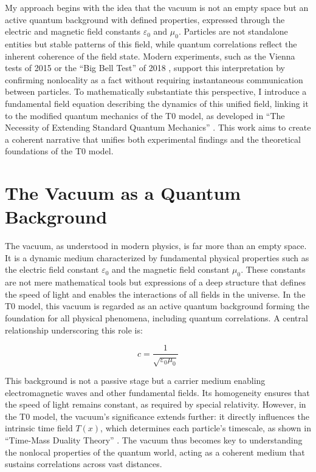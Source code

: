 \documentclass[a4paper,12pt]{article}
\newcommand{\Tfield}{T(x)}
\theoremstyle{definition}
\theoremstyle{remark}
\begin{document}
	My approach begins with the idea that the vacuum is not an empty space but an active quantum background with defined properties, expressed through the electric and magnetic field constants \(\varepsilon_0\) and \(\mu_0\). Particles are not standalone entities but stable patterns of this field, while quantum correlations reflect the inherent coherence of the field state. Modern experiments, such as the Vienna tests of 2015 \cite{Giustina2015} or the “Big Bell Test” of 2018 \cite{BigBellTest2018}, support this interpretation by confirming nonlocality as a fact without requiring instantaneous communication between particles. To mathematically substantiate this perspective, I introduce a fundamental field equation describing the dynamics of this unified field, linking it to the modified quantum mechanics of the T0 model, as developed in “The Necessity of Extending Standard Quantum Mechanics” \cite{pascher_quantum_2025}. This work aims to create a coherent narrative that unifies both experimental findings and the theoretical foundations of the T0 model.
	
	\section{The Vacuum as a Quantum Background}
	
	The vacuum, as understood in modern physics, is far more than an empty space. It is a dynamic medium characterized by fundamental physical properties such as the electric field constant \(\varepsilon_0\) and the magnetic field constant \(\mu_0\). These constants are not mere mathematical tools but expressions of a deep structure that defines the speed of light and enables the interactions of all fields in the universe. In the T0 model, this vacuum is regarded as an active quantum background forming the foundation for all physical phenomena, including quantum correlations. A central relationship underscoring this role is:
	
	\begin{equation}
		c = \frac{1}{\sqrt{\varepsilon_0 \mu_0}}
	\end{equation}
	
	This background is not a passive stage but a carrier medium enabling electromagnetic waves and other fundamental fields. Its homogeneity ensures that the speed of light remains constant, as required by special relativity. However, in the T0 model, the vacuum’s significance extends further: it directly influences the intrinsic time field \(\Tfield\), which determines each particle’s timescale, as shown in “Time-Mass Duality Theory” \cite{pascher_params_2025}. The vacuum thus becomes key to understanding the nonlocal properties of the quantum world, acting as a coherent medium that sustains correlations across vast distances.
	
\end{document}

